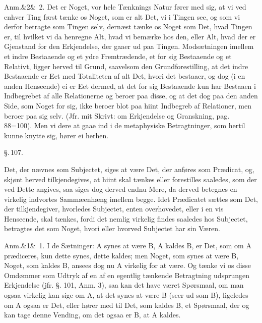 \documentclass[12pt]{book}
\def\sperr#1{#1}%
\def\textit#1{#1}%
\def\emph#1{#1}%
\newcommand{\sperr}[1]{\textls[180]{#1}}
\newcommand{\parag}[1]{%
  \par\vspace{0.9\baselineskip}%
  {\centering\textit{\S.\,#1.}\par}%
  \vspace{0.35\baselineskip}%
  \noindent\hspace{\parindent}\ignorespaces
}
\newcommand{\anm}[1]{%
  \par\vspace{0.5\baselineskip}%
  \noindent\hspace{\parindent}\sperr{Anm.}\ifx&#1&\else~\textit{#1}.\fi
  \enspace\ignorespaces
}
\newcommand{\opage}[1]{\marginnote{\footnotesize\textit{[#1]}}}
\begin{document}
\anm{2} Det er Noget, vor hele Tænknings Natur fører med sig, at vi ved enhver
Ting først tænke os Noget, som \emph{er} alt Det, vi i Tingen see, og som vi
derfor betragte som Tingen selv, dernæst tænke os Noget som Det, \emph{hvad}
Tingen er, til hvilket vi da henregne Alt, hvad vi bemærke hos den, eller Alt,
hvad der er Gjenstand for den Erkjendelse, der gaaer ud paa Tingen.
Modsætningen imellem et indre Bestaaende og et ydre Fremtrædende, et for sig
Bestaaende og et Relativt, ligger herved til Grund, saavelsom den
Grundforestilling, at det indre Bestaaende er Eet med Totaliteten af alt Det,
hvori det bestaaer, og dog (i en anden Henseende) ei er Eet dermed, at det for
sig Bestaaende kun har Bestaaen i Indbegrebet af alle Relationerne og beroer paa
disse, og at det dog paa den anden Side, som Noget for sig, ikke beroer blot paa
hiint Indbegreb af Relationer, men beroer paa sig selv. (Jfr. mit Skrivt: om
Erkjendelse og Granskning, pag. 88=100). Men vi%
\opage{258}dere at gaae ind i de metaphysiske Betragtninger, som hertil kunne knytte sig,
hører ei herhen.

\parag{107}
Det, der nævnes som Subjectet, siges at være Det, der anføres som Prædicat, og,
skjønt herved tilkjendegives, at hiint skal tænkes eller forestilles saaledes,
som der ved Dette angives, saa siges dog derved endnu Mere, da derved betegnes
en virkelig indvortes Sammæenhæng imellem begge. Idet Prædicatet sættes som Det,
der tilkjendegiver, hvorledes Subjectet, enten overhovedet, eller i en vis
Henseende, skal tænkes, fordi det nemlig virkelig findes saaledes hos Subjectet,
betragtes det som Noget, hvori eller hvorved Subjectet har sin Væren.

\anm{1} I de Sætninger: \textit{A} synes at være \textit{B}, \textit{A} kaldes
\textit{B}, er Det, som om \textit{A} prædiceres, kun dette synes, dette kaldes;
men Noget, som synes at være \textit{B}, Noget, som kaldes \textit{B}, ansees
dog nu \textit{A} virkelig for at være. Og tænke vi os disse Omdømmer som Udtryk
af en af en egentlig tænkende Betragtning udsprungen Erkjendelse (jfr. §. 101,
Anm. 3), saa kan det have været Spørsmaal, om man ogsaa virkelig kan sige om
\textit{A}, at det synes at være \textit{B} (seer ud som \textit{B}), ligeledes
om \textit{A} ogsaa er Det, eller hører med til Det, som kaldes \textit{B}, et
Spørsmaal, der og kan tage denne Vending, om det ogsaa er \textit{B}, at
\textit{A} kaldes.
\end{document}
